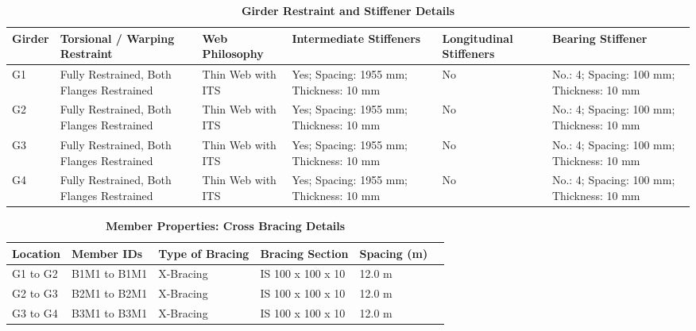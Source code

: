 \documentclass[12pt,a4paper]{report}
\numberwithin{table}{chapter}
\numberwithin{figure}{chapter}
\begin{document}
\vspace{4pt}
\begin{longtable}{|L{1.4cm}|p{2.2cm}|p{2.2cm}|p{3.0cm}|p{2.4cm}|p{2.2cm}|}
\caption{\textbf{Girder Restraint and Stiffener Details}}\\
\hline
\textbf{Girder} & \textbf{Torsional / Warping Restraint} & \textbf{Web Philosophy} & \textbf{Intermediate Stiffeners} & \textbf{Longitudinal Stiffeners} & \textbf{Bearing Stiffener} \\[6pt]
\hline
\endfirsthead
\endhead

G1 & Fully Restrained, Both Flanges Restrained & Thin Web with ITS & Yes; Spacing: 1955 mm; Thickness: 10 mm & No & No.: 4; Spacing: 100 mm; Thickness: 10 mm \\[8pt]
\hline
G2 & Fully Restrained, Both Flanges Restrained & Thin Web with ITS & Yes; Spacing: 1955 mm; Thickness: 10 mm & No & No.: 4; Spacing: 100 mm; Thickness: 10 mm \\[8pt]
\hline
G3 & Fully Restrained, Both Flanges Restrained & Thin Web with ITS & Yes; Spacing: 1955 mm; Thickness: 10 mm & No & No.: 4; Spacing: 100 mm; Thickness: 10 mm \\[8pt]
\hline
G4 & Fully Restrained, Both Flanges Restrained & Thin Web with ITS & Yes; Spacing: 1955 mm; Thickness: 10 mm & No & No.: 4; Spacing: 100 mm; Thickness: 10 mm \\[8pt]
\hline
\end{longtable}



\newpage

\vspace{0.4em}
\setlength{\tabcolsep}{4pt}
\setlength\LTleft{0pt}
\setlength\LTright{\fill}

\begin{longtable}{|L{2.2cm}|L{2.2cm}|L{3.0cm}|L{2.5cm}|C{1.8cm}|C{1.8cm}|}
\caption{\textbf{Member Properties: Cross Bracing Details}}
\hline
\textbf{Location} & \textbf{Member IDs} & \textbf{Type of Bracing} & \textbf{Bracing Section} & \textbf{Spacing (m)} \\
\hline
G1 to G2 & B1M1 to B1M1 & X-Bracing & IS 100 x 100 x 10 & 12.0 m \\[6pt]
\hline
G2 to G3 & B2M1 to B2M1 & X-Bracing & IS 100 x 100 x 10 & 12.0 m \\[6pt]
\hline
G3 to G4 & B3M1 to B3M1 & X-Bracing & IS 100 x 100 x 10 & 12.0 m \\[6pt]
\hline
\end{longtable}

\vspace{0.4em}
\noindent
\setlength{\tabcolsep}{4pt}
\setlength\LTleft{0pt}
\setlength\LTright{\fill}
\end{document}
